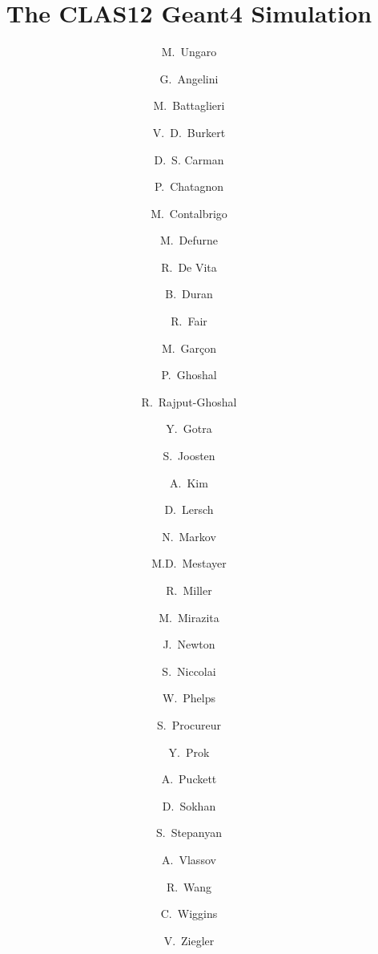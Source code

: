 \title{The CLAS12 Geant4 Simulation}




%


\author[JLAB]{M.~Ungaro}
\author[L]{G.~Angelini}
\author[INFNGE]{M.~Battaglieri}
\author[JLAB]{V.~D.~Burkert}
\author[JLAB]{D.~S. Carman}
\author[ORSAY]{P.~Chatagnon}
\author[N]{M.~Contalbrigo}
\author[SACLAY]{M.~Defurne}
\author[INFNGE]{R.~De Vita}
\author[K]{B.~Duran}
\author[JLAB]{R.~Fair}
\author[SACLAY]{M.~Gar\c con}
\author[JLAB]{P.~Ghoshal}
\author[JLAB]{R.~Rajput-Ghoshal}
\author[JLAB]{Y.~Gotra}
\author[O]{S.~Joosten}
\author[UCONN]{A.~Kim}
\author[J]{D.~Lersch}
\author[UCONN]{N.~Markov}
\author[JLAB]{M.D.~Mestayer}
\author[JLAB]{R.~Miller}
\author[M]{M.~Mirazita}
\author[H]{J.~Newton}
\author[ORSAY]{S.~Niccolai}
\author[L]{W.~Phelps}
\author[SACLAY]{S.~Procureur}
\author[H, I]{Y.~Prok}
\author[UCONN]{A.~Puckett}
\author[GLASGOW]{D.~Sokhan}
\author[JLAB]{S.~Stepanyan}
\author[G]{A.~Vlassov}
\author[ORSAY]{R.~Wang}
\author[JLAB]{C.~Wiggins}
\author[JLAB]{V.~Ziegler}

